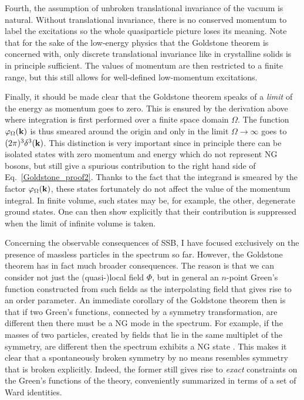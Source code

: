 \documentclass[final,2p,times,12pt,sort&compress]{elsarticle}
\newcommand\vek[1]{{\boldsymbol{\bf #1}}}   %
\newcommand\vp{\varphi}
\begin{document}
Fourth, the assumption of unbroken translational invariance of the vacuum is
natural. Without translational invariance, there is no conserved momentum to
label the excitations so the whole quasiparticle picture loses its meaning. Note
that for the sake of the low-energy physics that the Goldstone theorem is
concerned with, only discrete translational invariance like in crystalline
solids is in principle sufficient. The values of momentum are then restricted to
a finite range, but this still allows for well-defined low-momentum excitations.

Finally, it should be made clear that the Goldstone theorem speaks of a
\emph{limit} of the energy as momentum goes to zero. This is ensured by the
derivation above where integration is first performed over a finite space
domain $\Omega$. The function $\vp_\Omega(\vek k)$ is thus smeared around the
origin and only in the limit $\Omega\to\infty$ goes to $(2\pi)^3\delta^3(\vek
k)$. This distinction is very important since in principle there can be
isolated states with zero momentum and energy which do not represent NG bosons,
but still give a spurious contribution to the right hand side of
Eq.~\eqref{Goldstone_proof2}. Thanks to the fact that the integrand is smeared
by the factor $\vp_\Omega(\vek k)$, these states fortunately do not affect the
value of the momentum integral. In finite volume, such states may be, for
example, the other, degenerate ground states. One can then show explicitly
\cite{Lange:1966zz} that their contribution is suppressed when the limit of
infinite volume is taken.

Concerning the observable consequences of SSB, I have focused exclusively on
the presence of massless particles in the spectrum so far. However, the
Goldstone theorem has in fact much broader consequences. The reason is that we
can consider not just the (quasi-)local field $\Phi$, but in general an
$n$-point Green's function constructed from such fields as the interpolating
field that gives rise to an order parameter. An immediate corollary of the
Goldstone theorem then is that if two Green's functions, connected by a
symmetry transformation, are different then there must be a NG mode in the
spectrum. For example, if the masses of two particles, created by fields that
lie in the same multiplet of the symmetry, are different then the spectrum
exhibits a NG state \cite{Frishman:1966fk}. This makes it clear that a
spontaneously broken symmetry by no means resembles symmetry that is broken
explicitly. Indeed, the former still gives rise to \emph{exact} constraints on
the Green's functions of the theory, conveniently summarized in terms of a set
of Ward identities.
\end{document}
